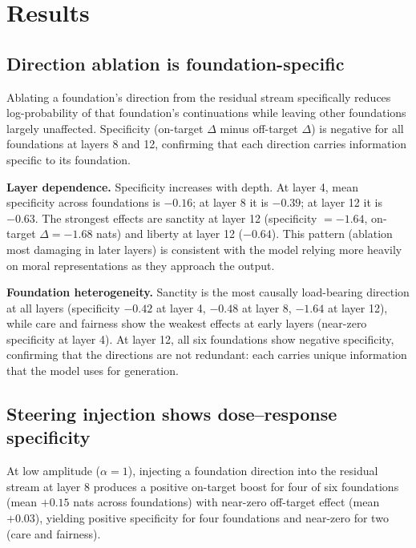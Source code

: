\section{Results}\label{results}

\subsection{\texorpdfstring{Direction ablation is foundation-specific \label{causal-validation}}{Direction ablation is foundation-specific }}\label{direction-ablation-is-foundation-specific}

Ablating a foundation's direction from the residual stream specifically reduces log-probability of that foundation's continuations while leaving other foundations largely unaffected.
Specificity (on-target \(\Delta\) minus off-target \(\Delta\)) is negative for all foundations at layers 8 and 12, confirming that each direction carries information specific to its foundation.

\textbf{Layer dependence.} Specificity increases with depth.
At layer 4, mean specificity across foundations is \(-0.16\); at layer 8 it is \(-0.39\); at layer 12 it is \(-0.63\).
The strongest effects are sanctity at layer 12 (specificity \(= -1.64\), on-target \(\Delta = -1.68\) nats) and liberty at layer 12 (\(-0.64\)).
This pattern (ablation most damaging in later layers) is consistent with the model relying more heavily on moral representations as they approach the output.

\textbf{Foundation heterogeneity.} Sanctity is the most causally load-bearing direction at all layers (specificity \(-0.42\) at layer 4, \(-0.48\) at layer 8, \(-1.64\) at layer 12), while care and fairness show the weakest effects at early layers (near-zero specificity at layer 4).
At layer 12, all six foundations show negative specificity, confirming that the directions are not redundant: each carries unique information that the model uses for generation.

\subsection{Steering injection shows dose--response specificity}\label{steering-injection-shows-doseresponse-specificity}

At low amplitude (\(\alpha = 1\)), injecting a foundation direction into the residual stream at layer 8 produces a positive on-target boost for four of six foundations (mean \(+0.15\) nats across foundations) with near-zero off-target effect (mean \(+0.03\)), yielding positive specificity for four foundations and near-zero for two (care and fairness).

